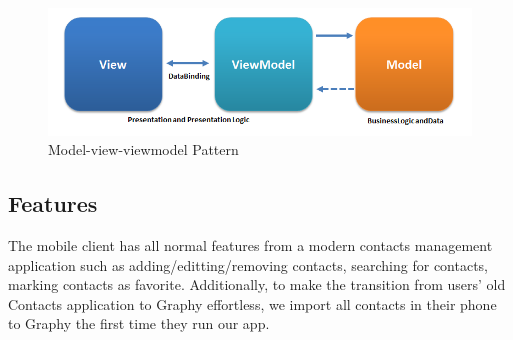 \begin{figure}[!h]
\begin{centering}
\includegraphics[scale=0.55]{pics/mvvm_pattern.png}
\caption{Model-view-viewmodel Pattern}\label{fg:mvvm_pattern}
\end{centering}
\end{figure}

\subsection{Features}
The mobile client has all normal features from a modern contacts management application such as adding/editting/removing contacts, searching for contacts, marking contacts as favorite. Additionally, to make the transition from users' old Contacts application to Graphy effortless, we import all contacts in their phone to Graphy the first time they run our app.

